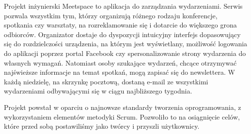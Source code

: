 Projekt inżynierski Meetspace to aplikacja do zarządzania wydarzeniami. Serwis pozwala wszystkim tym, którzy organizują różnego rodzaju konferencje, spotkania czy warsztaty, na rozreklamowanie się i dotarcie do większego grona odbiorców. Organizator dostaje do dyspozycji intuicyjny interfejs dopasowujący się do rozdzielczości urządzenia, na którym jest wyświetlany, możliwość logowania do aplikacji poprzez portal Facebook czy spersonalizowanie strony wydarzenia do własnych wymagań. Natomiast osoby szukające wydarzeń, chcące otrzymywać najświeższe informacje na temat spotkań, mogą zapisać się do newslettera. W każdą niedzielę, na skrzynkę pocztową, dostaną e-mail ze wszystkimi wydarzeniami odbywającymi się w ciągu najbliższego tygodnia.

Projekt powstał w oparciu o najnowsze standardy tworzenia oprogramowania, z wykorzystaniem elementów metodyki Scrum. Pozwoliło to na osiągnięcie celów, które przed sobą postawiliśmy jako twórcy i przyszli użytkownicy.
